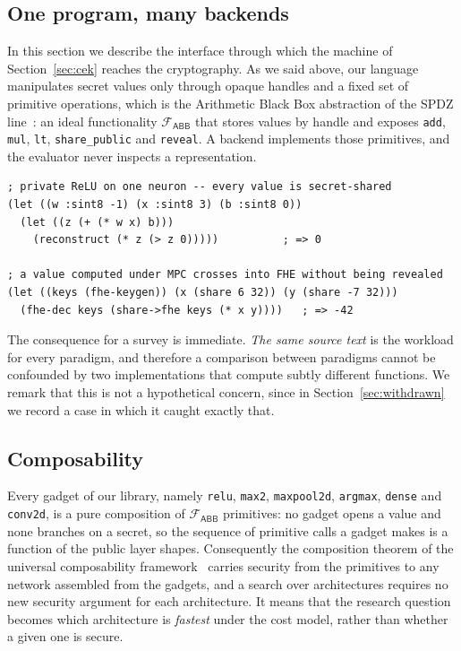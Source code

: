 \documentclass[11pt]{article}
\newcommand{\bt}[1]{\texttt{#1}}
\newcommand{\Fabb}{\mathcal{F}_{\mathsf{ABB}}}
\begin{document}
\subsection{One program, many backends}

In this section we describe the interface through which the machine of
Section~\ref{sec:cek} reaches the cryptography. As we said above, our language manipulates
secret values only through opaque handles and a fixed set of primitive operations, which is
the Arithmetic Black Box abstraction of the SPDZ line~\cite{DamgardNielsen,SPDZ}: an ideal
functionality $\Fabb$ that stores values by handle and exposes
\bt{add}, \bt{mul}, \bt{lt}, \bt{share\_public} and \bt{reveal}. A backend implements those
primitives, and the evaluator never inspects a representation.

\begin{lstlisting}
; private ReLU on one neuron -- every value is secret-shared
(let ((w :sint8 -1) (x :sint8 3) (b :sint8 0))
  (let ((z (+ (* w x) b)))
    (reconstruct (* z (> z 0)))))          ; => 0

; a value computed under MPC crosses into FHE without being revealed
(let ((keys (fhe-keygen)) (x (share 6 32)) (y (share -7 32)))
  (fhe-dec keys (share->fhe keys (* x y))))   ; => -42
\end{lstlisting}

The consequence for a survey is immediate. \emph{The same source text} is the workload
for every paradigm, and therefore a comparison between paradigms cannot be confounded by two
implementations that compute subtly different functions. We remark that this is not a
hypothetical concern, since in Section~\ref{sec:withdrawn} we record a case in which it caught
exactly that.

\subsection{Composability}

Every gadget of our library, namely \bt{relu}, \bt{max2}, \bt{maxpool2d}, \bt{argmax},
\bt{dense} and \bt{conv2d}, is a pure composition of $\Fabb$ primitives: no gadget opens a value
and none branches on a secret, so the sequence of primitive calls a gadget makes is a function of
the public layer shapes. Consequently the composition theorem of the universal composability
framework~\cite{Canetti} carries security from the primitives to any network assembled from the
gadgets, and a search over architectures requires no new security argument for each architecture.
It means that the research question becomes which architecture is \emph{fastest} under the cost
model, rather than whether a given one is secure.
\end{document}
